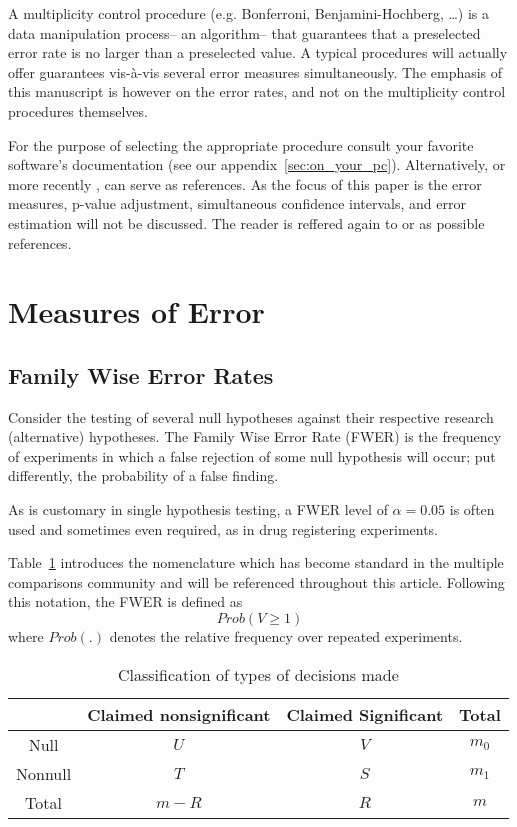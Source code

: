\documentclass[review,12pt]{article}
\theoremstyle{definition}
\theoremstyle{definition}
\begin{document}
A multiplicity control procedure (e.g. Bonferroni, Benjamini-Hochberg, \dots) is a data manipulation process-- an algorithm-- that guarantees that a preselected error rate is no larger than a preselected value. A typical procedures will actually offer guarantees vis-\`a-vis several error measures simultaneously. 
The emphasis of this manuscript is however on the error rates, and not on the multiplicity control procedures themselves. 


For the purpose of selecting the appropriate procedure consult your favorite software's documentation (see our appendix~\ref{sec:on_your_pc}). Alternatively, \citet{farcomeni_review_2008} or more recently \citet{goeman_tutorial_2013}, can serve as  references. 
As the focus of this paper is the error measures, p-value adjustment, simultaneous confidence intervals, and error estimation will not be discussed. The reader is reffered again to \cite{farcomeni_review_2008} or \cite{goeman_tutorial_2013} as possible references.


\section{\label{sec:measures_of_error}Measures of Error}

\subsection{Family Wise Error Rates}
Consider the testing of several null hypotheses against their respective research (alternative) hypotheses. The Family Wise Error Rate (FWER) is the frequency of experiments in which a false rejection of some null hypothesis will occur; put differently, the probability of a false finding.

As is customary in single hypothesis testing, a FWER level of $\alpha=0.05$ is often used and sometimes even required, as in drug registering experiments.




Table~\ref{tab:event_notation} introduces the nomenclature which has become standard in the multiple comparisons community and will be referenced throughout this article. Following this notation, the FWER is defined as $$Prob(V \geq 1 )$$ where $Prob(.)$ denotes the relative frequency over repeated experiments.



\begin{table}[h]
  \centering
\begin{tabular}{|c|c|c|c|}
\hline \rule[-1ex]{0pt}{1.5ex} & Claimed nonsignificant & Claimed Significant & Total \\ 
\hline
\hline \rule[-1ex]{0pt}{1.5ex} Null & $U$ & $V$ & $m_0$ \\ 
\hline \rule[-1ex]{0pt}{1.5ex} Nonnull & $T$ & $S$ & $m_1$ \\ 
\hline \rule[-1ex]{0pt}{1.5ex} Total & $m-R$ & $R$ & $m$ \\ 
\hline 
\end{tabular} 
  \caption{Classification of types of decisions made}
  \label{tab:event_notation}
\end{table}
\end{document}
